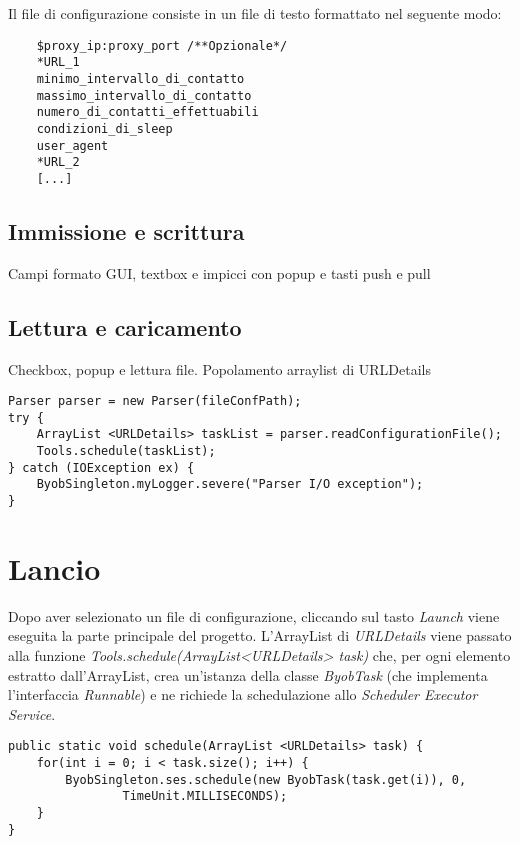 Il file di configurazione consiste in un file di testo formattato nel seguente modo:

\vspace{0.5cm}
\begin{lstlisting}
	$proxy_ip:proxy_port /**Opzionale*/
	*URL_1
	minimo_intervallo_di_contatto
	massimo_intervallo_di_contatto
	numero_di_contatti_effettuabili
	condizioni_di_sleep
	user_agent
	*URL_2
	[...]
\end{lstlisting}


\subsection{Immissione e scrittura}
Campi formato GUI, textbox e impicci con popup e tasti push e pull

\subsection{Lettura e caricamento}
Checkbox, popup e lettura file.
Popolamento arraylist di URLDetails

\vspace{0.5cm}
\begin{lstlisting}
Parser parser = new Parser(fileConfPath);
try {
	ArrayList <URLDetails> taskList = parser.readConfigurationFile();
	Tools.schedule(taskList);
} catch (IOException ex) {
	ByobSingleton.myLogger.severe("Parser I/O exception");
}
\end{lstlisting}


\section{Lancio}
Dopo aver selezionato un file di configurazione, cliccando sul tasto \textit{Launch} viene eseguita la parte principale del progetto.
L'ArrayList di \textit{URLDetails} viene passato alla funzione \textit{Tools.schedule(ArrayList<URLDetails> task)} che, per ogni elemento estratto dall'ArrayList, crea un'istanza della classe \textit{ByobTask} (che implementa l'interfaccia \textit{Runnable}) e ne richiede la schedulazione allo \textit{Scheduler Executor Service}.

\vspace{0.5cm}
\begin{lstlisting}
public static void schedule(ArrayList <URLDetails> task) {
    for(int i = 0; i < task.size(); i++) {
	    ByobSingleton.ses.schedule(new ByobTask(task.get(i)), 0,
			    TimeUnit.MILLISECONDS);
    }
}
\end{lstlisting}


